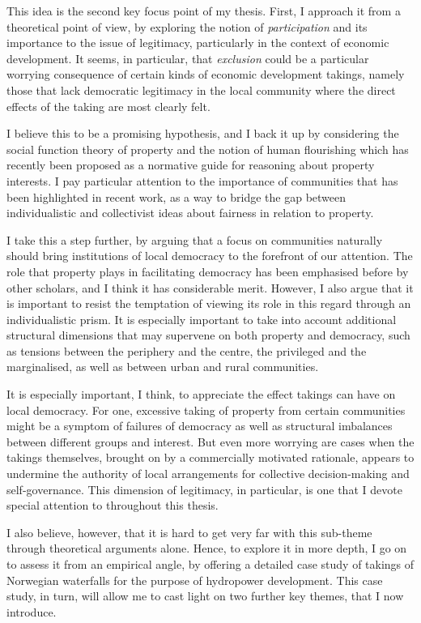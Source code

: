 \documentclass{article} %
\begin{document}
This idea is the second key focus point of my thesis. First, I approach it from a theoretical point of view, by exploring the notion of {\it participation} and its importance to the issue of legitimacy, particularly in the context of economic development. It seems, in particular, that {\it exclusion} could be a particular worrying consequence of certain kinds of economic development takings, namely those that lack democratic legitimacy in the local community where the direct effects of the taking are most clearly felt.

I believe this to be a promising hypothesis, and I back it up by considering the social function theory of property and the notion of human flourishing which has recently been proposed as a normative guide for reasoning about property interests. I pay particular attention to the importance of communities that has been highlighted in recent work, as a way to bridge the gap between individualistic and collectivist ideas about fairness in relation to property.

I take this a step further, by arguing that a focus on communities naturally should bring institutions of local democracy to the forefront of our attention. The role that property plays in facilitating democracy has been emphasised before by other scholars, and I think it has considerable merit. However, I also argue that it is important to resist the temptation of viewing its role in this regard through an individualistic prism. It is especially important to take into account additional structural dimensions that may supervene on both property and democracy, such as tensions between the periphery and the centre, the privileged and the marginalised, as well as between urban and rural communities.

It is especially important, I think, to appreciate the effect takings can have on local democracy. For one, excessive taking of property from certain communities might be a symptom of failures of democracy as well as structural imbalances between different groups and interest. But even more worrying are cases when the takings themselves, brought on by a commercially motivated rationale, appears to undermine the authority of local arrangements for collective decision-making and self-governance. This dimension of legitimacy, in particular, is one that I devote special attention to throughout this thesis.

I also believe, however, that it is hard to get very far with this sub-theme through theoretical arguments alone. Hence, to explore it in more depth, I go on to assess it from an empirical angle, by offering a detailed case study of takings of Norwegian waterfalls for the purpose of hydropower development. This case study, in turn, will allow me to cast light on two further key themes, that I now introduce. %
\end{document}

